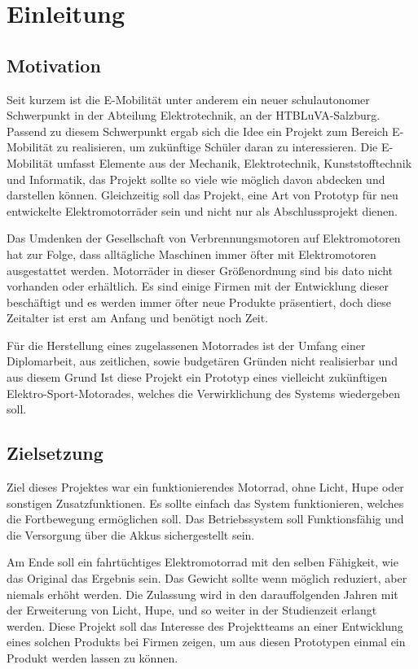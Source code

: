 \chapter{Einleitung}

\section{Motivation}
Seit kurzem ist die E-Mobilität unter anderem ein neuer schulautonomer Schwerpunkt in der Abteilung Elektrotechnik, an der HTBLuVA-Salzburg. Passend zu diesem Schwerpunkt ergab sich die Idee ein Projekt zum Bereich E-Mobilität zu realisieren, um zukünftige Schüler daran zu interessieren.
Die E-Mobilität umfasst Elemente aus der Mechanik, Elektrotechnik, Kunststofftechnik und Informatik, das Projekt sollte so viele wie möglich  davon abdecken und darstellen können. Gleichzeitig soll das Projekt, eine Art von Prototyp für neu entwickelte Elektromotorräder sein und nicht nur als Abschlussprojekt dienen.

Das Umdenken der Gesellschaft von Verbrennungsmotoren auf Elektromotoren hat zur Folge, dass alltägliche Maschinen immer öfter mit Elektromotoren ausgestattet werden. Motorräder in dieser Größenordnung sind bis dato nicht vorhanden oder erhältlich. Es sind einige Firmen mit der Entwicklung dieser beschäftigt und es werden immer öfter neue Produkte präsentiert, doch diese Zeitalter ist erst am Anfang und benötigt noch Zeit.

Für die Herstellung eines zugelassenen Motorrades ist der Umfang einer Diplomarbeit, aus zeitlichen, sowie budgetären Gründen nicht realisierbar und aus diesem Grund Ist diese Projekt ein Prototyp eines vielleicht zukünftigen Elektro-Sport-Motorades, welches die Verwirklichung des Systems wiedergeben soll.

\section{Zielsetzung}
Ziel dieses Projektes war ein funktionierendes Motorrad, ohne Licht, Hupe oder sonstigen Zusatzfunktionen. Es sollte einfach das System funktionieren, welches die Fortbewegung ermöglichen soll. Das Betriebssystem soll Funktionsfähig und die Versorgung über die Akkus sichergestellt sein. 

Am Ende soll ein fahrtüchtiges Elektromotorrad mit den selben Fähigkeit, wie das Original das Ergebnis sein. Das Gewicht sollte wenn möglich reduziert, aber niemals erhöht werden. Die Zulassung wird in den darauffolgenden Jahren mit der Erweiterung von Licht, Hupe, und so weiter in der Studienzeit erlangt werden. Diese Projekt soll das Interesse des Projektteams an einer Entwicklung eines solchen Produkts bei Firmen zeigen, um aus diesen Prototypen einmal ein Produkt werden lassen zu können.

